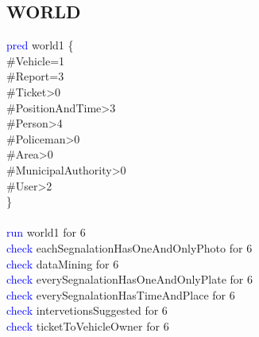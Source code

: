 \subsection{WORLD}
\textcolor{blue}{pred}
\textcolor{mycolor}{world1} \{\\
\#Vehicle=1\\
\#Report=3\\
\#Ticket>0\\
\#PositionAndTime>3\\
\#Person>4\\
\#Policeman>0\\
\#Area>0\\
\#MunicipalAuthority>0\\
\#User>2\\
\}\\
\\
\textcolor{blue}{run} world1 for 6\\
\textcolor{blue}{check}
\textcolor{mycolor}{eachSegnalationHasOneAndOnlyPhoto} for 6\\
\textcolor{blue}{check}
\textcolor{mycolor}{dataMining} for 6\\
\textcolor{blue}{check}
\textcolor{mycolor}{everySegnalationHasOneAndOnlyPlate} for 6\\
\textcolor{blue}{check}
\textcolor{mycolor}{everySegnalationHasTimeAndPlace} for 6\\
\textcolor{blue}{check}
\textcolor{mycolor}{intervetionsSuggested} for 6\\
\textcolor{blue}{check}
\textcolor{mycolor}{ticketToVehicleOwner} for 6\\